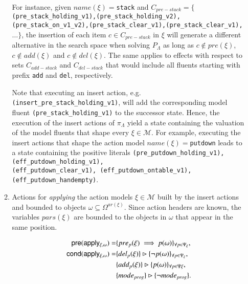 \begin{itemize}
\begin{enumerate}
\textcolor[rgb]{1.00,0.00,0.00}{For instance, given $name(\xi)=${\tt{\small stack}} and $C_{pre-stack}=\{${\tt{\small (pre\_stack\_holding\_v1),(pre\_stack\_holding\_v2), (pre\_stack\_on\_v1\_v2),(pre\_stack\_clear\_v1),(pre\_stack\_clear\_v1),}}$\ldots \}$, the insertion of each item $c \in C_{pre-stack}$ in $\xi$ will generate a different alternative in the search space when solving $P_{\Lambda}$ as long as $c \notin pre(\xi)$,  $c \notin add(\xi)$ and $c \notin del(\xi)$. The same applies to effects with respect to sets $C_{add-stack}$ and $C_{del-stack}$ that would include all fluents starting with prefix  {\tt{\small add}} and {\tt{\small del}}, respectively.}

\vspace{0.1cm}

\textcolor[rgb]{1.00,0.00,0.00}{Note that executing an insert action, e.g.{\tt{\small (insert\_pre\_stack\_holding\_v1)}}, will add the corresponding model fluent {\tt{\small (pre\_stack\_holding\_v1)}} to the successor state. Hence, the execution of the insert actions of $\pi_\Lambda$ yield a state containing the valuation of the model fluents that shape every $\xi \in \mathcal{M}$. For example, executing the insert actions that shape the action model $name(\xi)=${\tt{\small putdown}} leads to a state containing the positive literals {\tt{\small (pre\_putdown\_holding\_v1),(eff\_putdown\_holding\_v1),\\ (eff\_putdown\_clear\_v1),
(eff\_putdown\_ontable\_v1),(eff\_putdown\_handempty)}}.}

\item Actions for {\em applying} the action models $\xi\in\mathcal{M}$ built by the insert actions and bounded to objects $\omega\subseteq\Omega^{ar(\xi)}$. Since action headers are known, the variables $pars(\xi)$ are bounded to the objects in $\omega$ that appear in the same position.


\begin{small}
\begin{align*}
\hspace*{7pt}\mathsf{pre}(\mathsf{apply_{\xi,\omega}})=&\{pre_{p}(\xi)\implies p(\omega)\}_{\forall p\in\Psi_\xi},\\
\mathsf{cond}(\mathsf{apply_{\xi,\omega}})=&\{del_{p}(\xi)\}\rhd\{\neg p(\omega)\}_{\forall p\in\Psi_\xi},\\
&\{add_{p}(\xi)\}\rhd\{p(\omega)\}_{\forall p\in\Psi\xi},\\
&\{mode_{prog}\}\rhd\{\neg mode_{prog}\}.
\end{align*}
\end{small}


\end{enumerate}
\end{itemize}
